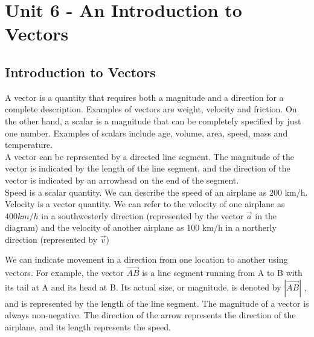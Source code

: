 \documentclass{article}
\begin{document}
\section{Unit 6 - An Introduction to Vectors}
\subsection{Introduction to Vectors}
A vector is a quantity that requires both a magnitude and a direction for a complete description.  Examples of vectors are weight, velocity and friction.  On the other hand, a scalar is a magnitude that can be completely specified by just one number.  Examples of scalars include age, volume, area, speed, mass and temperature.\\


A vector can be represented by a directed line segment.  The magnitude of the vector is indicated by the length of the line segment, and the direction of the vector is indicated by an arrowhead on the end of the segment.\\


Speed is a scalar quantity. We can describe the speed of an airplane as 200 km/h.\\


Velocity is a vector quantity. We can refer to the velocity of one airplane as $400 km/h$ in a southwesterly direction (represented by the vector $\vec{a}$ in the diagram) and the velocity of another airplane as 100 km/h in a northerly direction (represented by $\Vec{v}$)\\
\begin{center}
    
\end{center}


We can indicate movement in a direction from one location to another using vectors. For example, the vector $\overrightarrow{AB}$ is a line segment running from A to B with its tail at A and its head at B. Its actual size, or magnitude, is denoted by $|\overrightarrow{AB}|$ , and is represented by the length of the line segment. The magnitude of a vector is always non-negative. The direction of the arrow represents the direction of the airplane, and its length represents the speed.
\newpage
\end{document}

